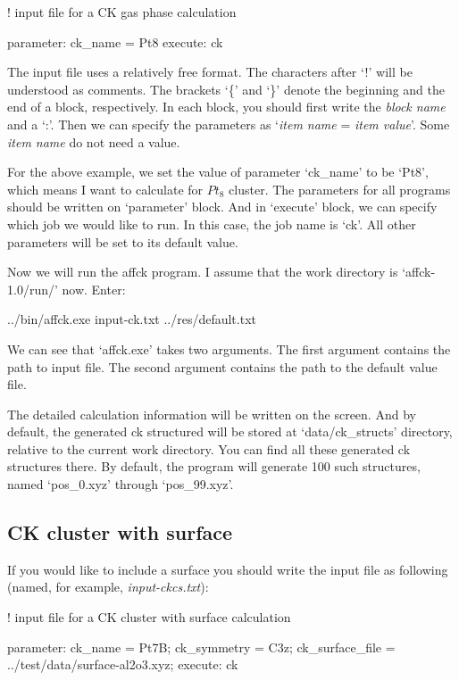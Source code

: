 \documentclass[11pt]{book}
\begin{document}
\begin{everbatim}

! input file for a CK gas phase calculation

{ parameter: ck_name = Pt8 }
{ execute: ck }

\end{everbatim}

The input file uses a relatively free format. The characters after `!' will be understood as comments.
The brackets `\{' and `\}' denote the beginning and the end of a block, respectively.
In each block, you should first write the \emph{block name} and a `:'.
Then we can specify the parameters as `\emph{item name} = \emph{item value}'. 
Some \emph{item name} do not need a value.

For the above example, we set the value of parameter `ck\_name' to be `Pt8', which means I want to 
calculate for $Pt_8$ cluster. The parameters for all programs should be written on `parameter' block. 
And in `execute' block, we can specify which job we would like to run. In this case, the job name is `ck'.
All other parameters will be set to its default value.

Now we will run the affck program. I assume that the work directory is `affck-1.0/run/' now. Enter:

\begin{everbatim}
../bin/affck.exe input-ck.txt ../res/default.txt
\end{everbatim}

We can see that `affck.exe' takes two arguments. The first argument contains the path to input file.
The second argument contains the path to the default value file.

The detailed calculation information will be written on the screen. 
And by default, the generated ck structured will be stored at `data/ck\_structs' directory, relative to the current work directory. 
You can find all these generated ck structures there. By default, the program will generate 100 such structures, named `pos\_0.xyz'
through `pos\_99.xyz'.

\subsection{CK cluster with surface}

If you would like to include a surface you should write the input file as following (named, for example, \emph{input-ckcs.txt}):

\begin{everbatim}

! input file for a CK cluster with surface calculation

{ parameter: 
   ck_name         = Pt7B;
   ck_symmetry     = C3z;
   ck_surface_file = ../test/data/surface-al2o3.xyz;
}
{ execute: ck }

\end{everbatim}
\end{document}
